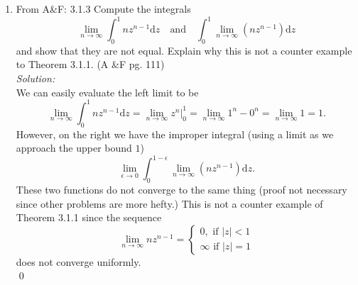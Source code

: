 \documentclass[10pt]{amsart}
\newcommand{\D}{\mathrm{d}}
\theoremstyle{nonumberplain}
\begin{document}
\begin{enumerate}[label={\bf {\arabic*}:}]
\newpage
\item From A\&F: 3.1.3
Compute the integrals
$$
\lim_{n \rightarrow \infty} \int_0^1 nz^{n -1}\D z \quad \text{and} \quad \int_0^1 \lim_{n \rightarrow \infty} \left(nz^{n -1} \right) \D z
$$
and show that they are not equal.
Explain why this is not a counter example to Theorem 3.1.1. (A \&F pg. 111) \\
\textit{Solution:} \\
We can easily evaluate the left limit to be
$$
\lim_{n \rightarrow \infty} \int_0^1 nz^{n -1}\D z = \lim_{n \rightarrow \infty} \left. z^n \right|_0^1 = \lim_{n \rightarrow \infty} 1^n - 0^n = \lim_{n \rightarrow \infty} 1 = 1.
$$
However, on the right we have the improper integral (using a limit as we approach the upper bound $1$)
$$
\lim_{\epsilon \rightarrow 0}\int_0^{1-\epsilon} \lim_{n \rightarrow \infty} \left(nz^{n -1} \right) \D z.
$$
These two functions do not converge to the same thing (proof not necessary since other problems are more hefty.)
This is not a counter example of Theorem 3.1.1 since the sequence
$$
\lim_{n \rightarrow \infty} nz^{n - 1} =
\begin{cases}
0, \text{ if } |z| < 1 \\
\infty \text{ if } |z| = 1
\end{cases}
$$
does not converge uniformly. \\
\qed \\
\end{enumerate}
\end{document}
